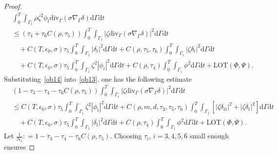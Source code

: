 \documentclass[10pt]{elsarticle}
\begin{document}
\begin{proof}
\begin{equation}\label{ob14}
\begin{split}
&\int_{0}^{T}\int_{\Gamma_1} {\rho \zeta^2 {\phi}_t \mathrm{div}_{\Gamma}\left(\sigma\nabla_{\Gamma} {\delta}\right)} \mathrm{d}\Gamma \mathrm{d}t \\
&\leqslant (\tau_4 + \tau_6 C(\rho, \tau_5))\int_{0}^{T}\int_{\Gamma_1} |\zeta\mathrm{div}_{\Gamma}\left(\sigma\nabla_{\Gamma} {\delta}\right)|^2\mathrm{d}\Gamma \mathrm{d}t  \\
&\quad +C(T, \epsilon_0, \sigma)\tau_5\int_{0}^{T}\int_{\Gamma_1} |\delta_t|^2 \mathrm{d}\Gamma \mathrm{d}t+ C(\rho, \tau_5, \tau_6)\int_{0}^{T}\int_{\Gamma_1}|\zeta\delta_t|^2\mathrm{d}\Gamma \mathrm{d}t \\
&\quad +C(T, \epsilon_0, \sigma)\tau_5\int_{0}^{T}\int_{\Gamma_1} \zeta^2|\phi_t|^2 \mathrm{d}\Gamma \mathrm{d}t+C(\rho, \tau_4)\int_{0}^{T}\int_{\Gamma_1} {\phi}^2\mathrm{d}\Gamma \mathrm{d}t + \textrm{LOT}(\Phi, \Psi).
\end{split}
\end{equation}
Substituting~\eqref{ob14} into~\eqref{ob13}, one has the following estimate
 \begin{equation}\label{ob15}
\begin{split}
&(1-\tau_3-\tau_4 - \tau_6 C(\rho, \tau_5))\int_{0}^{T}\int_{\Gamma_1}|\zeta\mathrm{div}_{\Gamma}\left(\sigma\nabla_{\Gamma} {\delta}\right)|^2 \mathrm{d}\Gamma \mathrm{d}t\\
&\leqslant C(T, \epsilon_0, \sigma)\tau_5\int_{0}^{T}\int_{\Gamma_1} \zeta^2|\phi_t|^2 \mathrm{d}\Gamma \mathrm{d}t+ C(\rho, m, d, \tau_3,  \tau_5, \tau_6)\int_{0}^{T}\int_{\Gamma_1}\left[|\zeta \delta_{tt}|^2 +|\zeta\delta_t|^2 \right]\mathrm{d}\Gamma \mathrm{d}t\\
&\quad+C(T, \epsilon_0, \sigma)\tau_5\int_{0}^{T}\int_{\Gamma_1} |\delta_t|^2 \mathrm{d}\Gamma \mathrm{d}t +C(\rho, \tau_4)\int_{0}^{T}\int_{\Gamma_1} {\phi}^2\mathrm{d}\Gamma \mathrm{d}t+\textrm{LOT}(\Phi, \Psi).
\end{split}
\end{equation}
Let $\frac{1}{N_1}: = 1-\tau_3-\tau_4 - \tau_6 C(\rho, \tau_5)$. Choosing $\tau_i$, $i=3, 4, 5, 6$ small enough ensures 

\end{proof}
\end{document}
